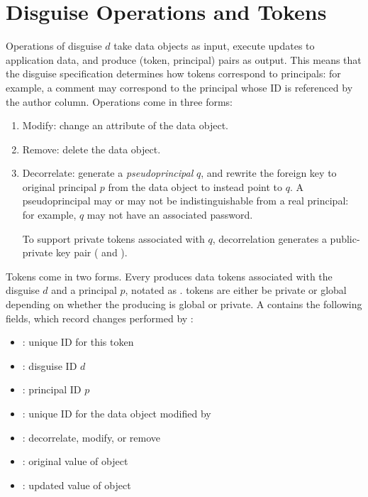 \section{Disguise Operations and Tokens}

Operations  of disguise $d$ take data objects as input, execute updates to application
data, and produce (token, principal) pairs
as output. This means that the disguise specification determines how tokens correspond to
principals: for example, a comment may correspond to the principal whose ID is referenced by the
author column.
Operations come in three forms:
\begin{enumerate}
    \item Modify: change an attribute of the data object.
    \item Remove: delete the data object.
    \item Decorrelate: generate a \emph{pseudoprincipal} $q$, and rewrite the foreign key to original
        principal $p$ from the data object to instead point to $q$.
        A pseudoprincipal may or may not be indistinguishable from a real principal: for example,
        $q$ may not have an associated password.

        To support private tokens associated with $q$, decorrelation generates a
        public-private key pair ( and ).
\end{enumerate}

\noindent
Tokens come in two forms. Every  produces data tokens associated with the disguise $d$ and a
principal $p$, notated as .  tokens are either be private or global depending on
whether the producing  is global or private. 
A  contains the following fields, which record changes performed by :
\begin{itemize}
\item {}: unique ID for this token
\item {}: disguise ID $d$ 
\item {}: principal ID $p$
\item {}: unique ID for the data object modified by 
\item {}: decorrelate, modify, or remove
\item {}: original value of object 
\item {}: updated value of object 
\end{itemize}

